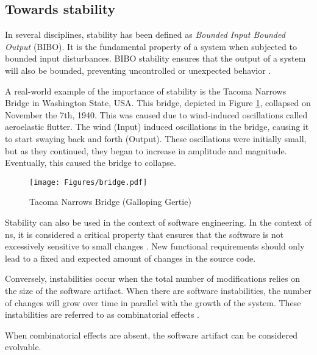 \subsection{Towards stability} \label{subsec_on_stability}

In several disciplines, stability has been defined as \emph{Bounded Input Bounded Output}
(BIBO). It is the fundamental property of a system when subjected to bounded input
disturbances. BIBO stability ensures that the output of a system will also be bounded,
preventing uncontrolled or unexpected behavior \parencite[270]{mannaert_normalized_2016}. 

A real-world example of the importance of stability is the Tacoma Narrows Bridge in
Washington State, USA. This bridge, depicted in Figure \ref*{fig_bridge}, collapsed on
November the 7th, 1940. This was caused due to wind-induced oscillations called
aeroelastic flutter. The wind (Input) induced oscillations in the bridge, causing it to
start swaying back and forth (Output). These oscillations were initially small, but as
they continued, they began to increase in amplitude and magnitude. Eventually, this 
caused the bridge to collapse.

\begin{figure}[H]
    \centering
    \texttt{[image: Figures/bridge.pdf]}
    \caption[TNB]{Tacoma Narrows Bridge (Galloping Gertie)}
    \label{fig_bridge}
\end{figure}

Stability can also be used in the context of software engineering. In the context of
\gls{ns}, it is considered a critical property that ensures that the software is not
excessively sensitive to small changes \parencite[270]{mannaert_normalized_2016}. New
functional requirements should only lead to a fixed and expected amount of changes in
the source code. 

Conversely, instabilities occur when the total number of modifications relies on the size
of the software artifact. When there are software instabilities, the number of changes
will grow over time in parallel with the growth of the system. These instabilities are
referred to as combinatorial effects \parencite[270]{mannaert_normalized_2016}. 

When combinatorial effects are absent, the software artifact can be considered evolvable.